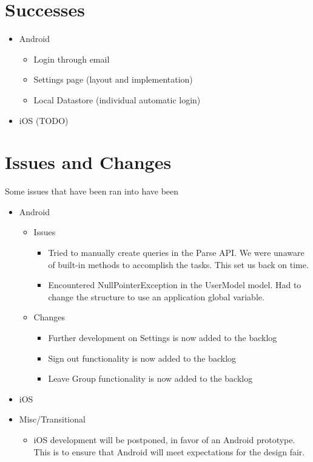 \documentclass[11pt]{article}
\begin{document}
\section*{Successes}

	\begin{itemize}
		\item Android
		\begin{itemize}
			\item Login through email
			\item Settings page (layout and implementation)
			\item Local Datastore (individual automatic login)
		\end{itemize}
		
		\item iOS (TODO)
	\end{itemize}


\section*{Issues and Changes}
Some issues that have been ran into have been

	\begin{itemize}
		\item Android
			\begin{itemize}
				\item Issues
				\begin{itemize}
					\item Tried to manually create queries in the Parse API. We were unaware of built-in methods to accomplish the tasks. This set us back on time.
					\item Encountered NullPointerException in the UserModel model. Had to change the structure to use an application global variable.					
				\end{itemize}
				
				\item Changes
				\begin{itemize}
					\item Further development on Settings is now added to the backlog
					\item Sign out functionality is now added to the backlog
					\item Leave Group functionality is now added to the backlog			
				\end{itemize}
			\end{itemize}
		\item iOS
		\item Misc/Transitional
		\begin{itemize}
			\item iOS development will be postponed, in favor of an Android prototype. This is to ensure that Android will meet expectations for the design fair.
		\end{itemize}
	\end{itemize}
\end{document}
